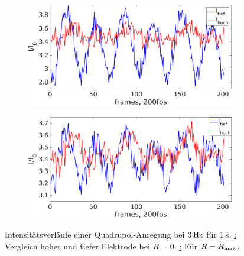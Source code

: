           \begin{figure}[!b]
            \centering
            \begin{subfigure}{0.49\textwidth}
              \centering
              \includegraphics[width=\textwidth,height=0.65\textwidth]{figs/auswertung/plasmaglw/intenshochutiefquadin3Hz1sek.png}
            \end{subfigure}
            \begin{subfigure}{0.49\textwidth}
              \centering
              \includegraphics[width=\textwidth,height=0.65\textwidth]{figs/auswertung/plasmaglw/intenshochutiefquadout3Hz1sek.png}
            \end{subfigure}
            \caption{Intensitätsverläufe einer Quadrupol-Anregung bei $\unit[3]{Hz}$ für $\unit[1]{s}$. \underline{:} Vergleich hoher und tiefer Elektrode bei $R=0$. \underline{:} Für $R=R_\text{max}$.}\label{img:intensquadhochutiefrad}
          \end{figure}

